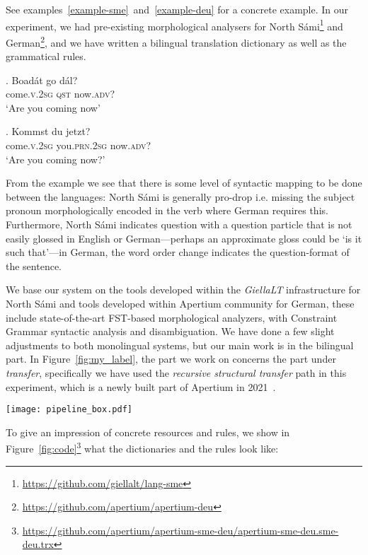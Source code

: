 \documentclass{flammie}
\begin{document}
See examples~\ref{example-sme}~and~\ref{example-deu} for a concrete example.  In
our experiment, we had pre-existing morphological analysers for North
Sámi\footnote{\url{https://github.com/giellalt/lang-sme}} and
German\footnote{\url{https://github.com/apertium/apertium-deu}}, and we have
written a bilingual translation dictionary as well as the grammatical rules.

\exg.  Boadát go dál?\label{example-sme}\\
come\textsc{.v.2sg} \textsc{qst} now\textsc{.adv}?\\
`Are you coming now'

\exg.  Kommst du jetzt?\label{example-deu}\\
come\textsc{.v.2sg} you\textsc{.prn.2sg} now\textsc{.adv}?\\
`Are you coming now?'

From the example we see that there is some level of syntactic mapping to be done
between the languages: North Sámi is generally pro-drop i.e. missing the subject
pronoun morphologically encoded in the verb where German requires this.
Furthermore, North Sámi indicates question with a question particle that is not
easily glossed in English or German---perhaps an approximate gloss could be `is
it such that'---in German, the word order change indicates the question-format
of the sentence.

We base our system on the tools developed within the \textit{GiellaLT}
infrastructure for North Sámi and tools developed within Apertium community for
German, these include state-of-the-art FST-based morphological analyzers, with
Constraint Grammar syntactic analysis and disambiguation. We have done a few
slight adjustments to both monolingual systems, but our main work is in the
bilingual part. In Figure~\ref{fig:my_label}, the part we work on concerns the
part under \textit{transfer}, specifically we have used the \textit{recursive
structural transfer} path in this experiment, which is a newly built part of
Apertium in 2021~\cite{khanna2021recent}.

\begin{figure*}[htb]
    \centering
    \texttt{[image: pipeline\_box.pdf]}
    \caption{Apertium pipeline structure from \cite{khanna2021recent}
    \label{fig:my_label}}
\end{figure*}

To give an impression of concrete resources and rules, we show in
Figure~\ref{fig:code}\footnote{\url{https://github.com/apertium/apertium-sme-deu/apertium-sme-deu.sme-deu.trx}}
what the dictionaries and the rules look like:
\end{document}
